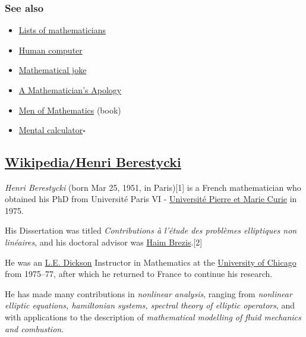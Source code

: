 \documentclass{article}
\begin{document}
\subsubsection{See also}
\begin{itemize}
	\item \href{https://en.wikipedia.org/wiki/Lists_of_mathematicians}{Lists of mathematicians}
	\item \href{https://en.wikipedia.org/wiki/Human_computer}{Human computer}
	\item \href{https://en.wikipedia.org/wiki/Mathematical_joke}{Mathematical joke}
	\item \href{https://en.wikipedia.org/wiki/A_Mathematician's_Apology}{A Mathematician's Apology}
	\item \href{https://en.wikipedia.org/wiki/Men_of_Mathematics}{Men of Mathematics} (book)
	\item \href{https://en.wikipedia.org/wiki/Mental_calculator}{Mental calculator}\hfill$\square$
\end{itemize}


\subsection{\href{https://en.wikipedia.org/wiki/Henri_Berestycki}{Wikipedia{\tt/}Henri Berestycki}}
\textit{Henri Berestycki} (born Mar 25, 1951, in Paris)[1] is a French mathematician who obtained his PhD from Université Paris VI - \href{https://en.wikipedia.org/wiki/Universit\%C3\%A9_Pierre_et_Marie_Curie}{Université Pierre et Marie Curie} in 1975.

His Dissertation was titled \textit{Contributions à l'étude des problèmes elliptiques non linéaires}, and his doctoral advisor was \href{https://en.wikipedia.org/wiki/Haim_Brezis}{Haim Brezis}.[2]

He was an \href{https://en.wikipedia.org/wiki/Leonard_Eugene_Dickson}{L.E. Dickson} Instructor in Mathematics at the \href{https://en.wikipedia.org/wiki/University_of_Chicago}{University of Chicago} from 1975--77, after which he returned to France to continue his research.

He has made many contributions in \textit{nonlinear analysis}, ranging from \textit{nonlinear elliptic equations, hamiltonian systems, spectral theory of elliptic operators}, and with applications to the description of \textit{mathematical modelling of fluid mechanics and combustion}.
\end{document}
